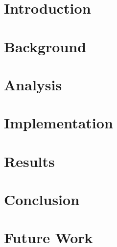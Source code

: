\documentclass[a4paper]{article}
\begin{document}


\tableofcontents

\newpage

\section{Introduction}

\section{Background}

\section{Analysis}

\section{Implementation}

\section{Results}

\section{Conclusion}

\section{Future Work}
\end{document}
